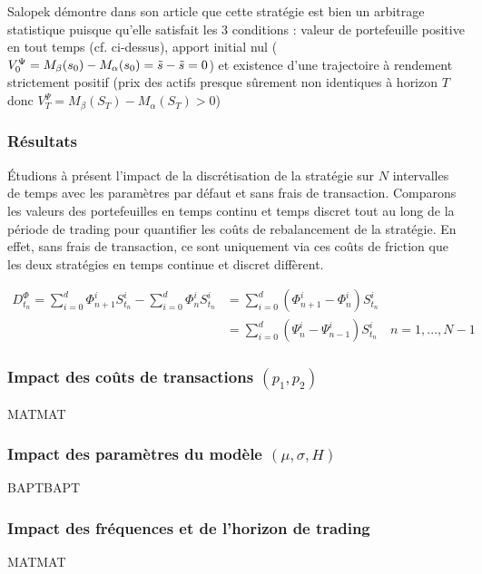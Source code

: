 \documentclass[12pt,a4paper]{article}
\begin{document}
Salopek démontre dans son article que cette stratégie est bien un arbitrage statistique puisque qu'elle satisfait les 3 conditions : valeur de portefeuille positive en tout temps (cf. ci-dessus), apport initial nul ($V^{\Psi}_0 = M_{\beta}(s_0) - M_{\alpha}(s_0) = \Tilde{s} - \Tilde{s} = 0$) et existence d'une trajectoire à rendement strictement positif (prix des actifs presque sûrement non identiques à horizon $T$ donc $V^{\Psi}_T = M_{\beta}(S_T) - M_{\alpha}(S_T) > 0$)

\subsubsection{Résultats}\label{subsubsec:strategiesalopekresult}

Étudions à présent l'impact de la discrétisation de la stratégie sur $N$ intervalles de temps avec les paramètres par défaut et sans frais de transaction. Comparons les valeurs des portefeuilles en temps continu et temps discret tout au long de la période de trading pour quantifier les coûts de rebalancement de la stratégie. En effet, sans frais de transaction, ce sont uniquement via ces coûts de friction que les deux stratégies en temps continue et discret diffèrent. 

\begin{align}
D^{\Phi}_{t_n} = \sum_{i=0}^{d} \Phi_{n+1}^i S_{t_n}^i - \sum_{i=0}^{d} \Phi_{n}^i S_{t_n}^i &= \sum_{i=0}^{d} \left(\Phi_{n+1}^i - \Phi_{n}^i \right) S_{t_n}^i \\ 
&= \sum_{i=0}^{d} \left(\Psi_{n}^i - \Psi_{n-1}^i \right) S_{t_n}^i \quad n = 1,...,N-1
\end{align}




\subsubsection{Impact des coûts de transactions $(p_1, p_2)$}\label{subsubsec:strategiesalopekfees}
MATMAT
\subsubsection{Impact des paramètres du modèle $(\mu, \sigma, H)$}\label{subsubsec:strategiesalopekmodelparam}
BAPTBAPT
\subsubsection{Impact des fréquences et de l'horizon de trading}\label{subsubsec:strategiesalopekhorizon}
MATMAT
\end{document}

